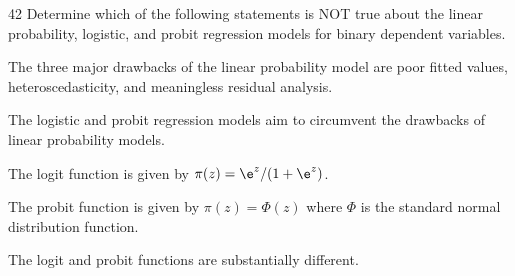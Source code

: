 \begin{question}{42}
Determine which of the following statements is NOT true about the linear probability, logistic, and probit regression models for binary dependent variables.

\begin{choices}
\item The three major drawbacks of the linear probability model are poor fitted values, heteroscedasticity, and meaningless residual analysis.
\item The logistic and probit regression models aim to circumvent the drawbacks of linear probability models.
\item The logit function is given by $\pi(z) = \e^z / (1 + \e^z)$.
\item The probit function is given by $\pi(z) = \Phi(z)$ where $\Phi$ is the standard normal distribution function.
\item The logit and probit functions are substantially different.
\end{choices}
\end{question}

